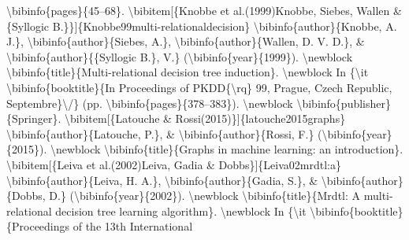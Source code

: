 \documentclass{article}%
\begin{document}
\textbackslash{}bibinfo\{pages\}\{45–68\}.\newline%
\textbackslash{}bibitem{[}\{Knobbe et al.(1999)Knobbe, Siebes, Wallen \& \{Syllogic\newline%
B.\}\}{]}\{Knobbe99multi{-}relationaldecision\}\newline%
\textbackslash{}bibinfo\{author\}\{Knobbe, A. J.\}, \textbackslash{}bibinfo\{author\}\{Siebes, A.\},\newline%
\textbackslash{}bibinfo\{author\}\{Wallen, D. V. D.\}, \& \textbackslash{}bibinfo\{author\}\{\{Syllogic B.\}, V.\}\newline%
(\textbackslash{}bibinfo\{year\}\{1999\}).\newline%
\textbackslash{}newblock \textbackslash{}bibinfo\{title\}\{Multi{-}relational decision tree induction\}.\newline%
\textbackslash{}newblock In \{\textbackslash{}it \textbackslash{}bibinfo\{booktitle\}\{In Proceedings of PKDD\{\textbackslash{}rq\} 99, Prague,\newline%
Czech Republic, Septembre\}\textbackslash{}/\} (pp. \textbackslash{}bibinfo\{pages\}\{378–383\}).\newline%
\textbackslash{}newblock \textbackslash{}bibinfo\{publisher\}\{Springer\}.\newline%
\textbackslash{}bibitem{[}\{Latouche \& Rossi(2015)\}{]}\{latouche2015graphs\}\newline%
\textbackslash{}bibinfo\{author\}\{Latouche, P.\}, \& \textbackslash{}bibinfo\{author\}\{Rossi, F.\}\newline%
(\textbackslash{}bibinfo\{year\}\{2015\}).\newline%
\textbackslash{}newblock \textbackslash{}bibinfo\{title\}\{Graphs in machine learning: an introduction\}.\newline%
\textbackslash{}bibitem{[}\{Leiva et al.(2002)Leiva, Gadia \& Dobbs\}{]}\{Leiva02mrdtl:a\}\newline%
\textbackslash{}bibinfo\{author\}\{Leiva, H. A.\}, \textbackslash{}bibinfo\{author\}\{Gadia, S.\}, \&\newline%
\textbackslash{}bibinfo\{author\}\{Dobbs, D.\} (\textbackslash{}bibinfo\{year\}\{2002\}).\newline%
\textbackslash{}newblock \textbackslash{}bibinfo\{title\}\{Mrdtl: A multi{-}relational decision tree learning\newline%
algorithm\}.\newline%
\textbackslash{}newblock In \{\textbackslash{}it \textbackslash{}bibinfo\{booktitle\}\{Proceedings of the 13th International\newline%
\end{document}
